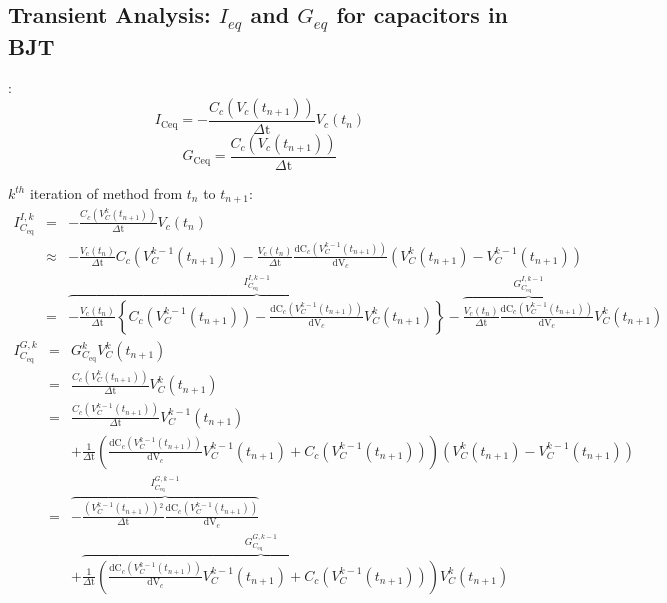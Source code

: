 \documentclass{article}
\begin{document}
\subsection{Transient Analysis: $I_{eq}$ and  $G_{eq}$ for capacitors in BJT}
:\\
\begin{equation*}
I_{\text{Ceq}}=-\frac{C_c\left(V_c\left(t_{n+1}\right)\right)}{\text{$\Delta $t}}V_c\left(t_n\right)
\end{equation*}
\begin{equation*}
G_{\text{Ceq}}=\frac{C_c\left(V_c\left(t_{n+1}\right)\right)}{\text{$\Delta $t}}
\end{equation*}

$k^{th}$ iteration of \NR method from $t_n$ to $t_{n+1}$:
\begin{eqnarray*}
I_{C_{\text{eq}}}^{I,k}&=&-\frac{C_c\left(V_C^k\left(t_{n+1}\right)\right)}{\text{$\Delta $t}}V_c\left(t_n\right)
\\ &\approx&
-\frac{V_c\left(t_n\right)}{\text{$\Delta $t}}C_c\left(V_C^{k-1}\left(t_{n+1}\right)\right)-\frac{V_c\left(t_n\right)}{\text{$\Delta $t}}\frac{\text{dC}_c\left(V_C^{k-1}\left(t_{n+1}\right)\right)}{\text{dV}_c}\left(V_C^k\left(t_{n+1}\right)-V_C^{k-1}\left(t_{n+1}\right)\right)
\\&=&
\overbrace{-\frac{V_c\left(t_n\right)}{\text{$\Delta $t}}\left\{C_c\left(V_C^{k-1}\left(t_{n+1}\right)\right)-\frac{\text{dC}_c\left(V_C^{k-1}\left(t_{n+1}\right)\right)}{\text{dV}_c}V_C^k\left(t_{n+1}\right)\right\}}^{I_{C_{\text{eq}}}^{I,k-1}}
-\overbrace{\frac{V_c\left(t_n\right)}{\text{$\Delta $t}}\frac{\text{dC}_c\left(V_C^{k-1}\left(t_{n+1}\right)\right)}{\text{dV}_c}}^{G_{C_{\text{eq}}}^{I,k-1}}V_C^k\left(t_{n+1}\right)
\end{eqnarray*}
\begin{eqnarray*}
I_{C_{\text{eq}}}^{G,k}&=&G_{C_{\text{eq}}}^kV_C^k\left(t_{n+1}\right)
\\&=&\frac{C_c\left(V_C^k\left(t_{n+1}\right)\right)}{\text{$\Delta $t}}V_C^k\left(t_{n+1}\right)
\\&=&
\frac{C_c\left(V_C^{k-1}\left(t_{n+1}\right)\right)}{\text{$\Delta $t}}V_C^{k-1}\left(t_{n+1}\right)
\\&&
+\frac{1}{\text{$\Delta $t}}\left(\frac{\text{dC}_c\left(V_C^{k-1}\left(t_{n+1}\right)\right)}{\text{dV}_c}V_C^{k-1}\left(t_{n+1}\right)+C_c\left(V_C^{k-1}\left(t_{n+1}\right)\right)\right)\left(V_C^k\left(t_{n+1}\right)-V_C^{k-1}\left(t_{n+1}\right)\right)
\\&=&
\overbrace{-\frac{\left(V_C^{k-1}\left(t_{n+1}\right)\right){}^2}{\text{$\Delta $t}}\frac{\text{dC}_c\left(V_C^{k-1}\left(t_{n+1}\right)\right)}{\text{dV}_c}}^{I_{C_{\text{eq}}}^{G,k-1}}
\\&&
+\overbrace{\frac{1}{\text{$\Delta $t}}\left(\frac{\text{dC}_c\left(V_C^{k-1}\left(t_{n+1}\right)\right)}{\text{dV}_c}V_C^{k-1}\left(t_{n+1}\right)+C_c\left(V_C^{k-1}\left(t_{n+1}\right)\right)\right)}^{G_{C_{\text{eq}}}^{G,k-1}}V_C^k\left(t_{n+1}\right)
\end{eqnarray*}
\end{document}
